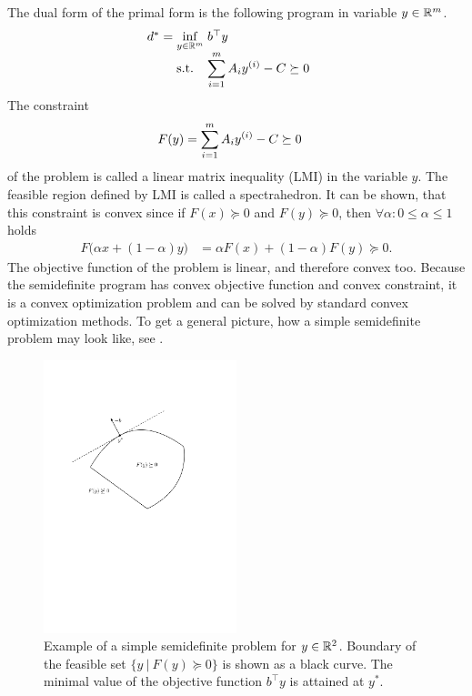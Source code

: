 The dual form of the primal form is the following program in variable $y\in\mathbb{R}^m$.
\begin{align}
  \arraycolsep=1.4pt
  \begin{array}{rclrcl@{\hskip0.5cm}l}
    d^* &=& \displaystyle \inf_{y\in\R^m} & \multicolumn{3}{l}{b^\top y} \\
    && \text{s.t.} & \displaystyle \sum_{i=1}^m A_iy\ind i - C &\succeq& 0
  \end{array}\labeleq{SDP:prelim:dual}
\end{align}
The constraint 
\begin{align}
  F(y) &= \sum_{i=1}^m A_iy^{(i)} - C \succeq 0
\end{align}
of the problem  is called a linear matrix inequality (LMI) in the variable $y$.
The feasible region defined by LMI is called a spectrahedron.
It can be shown, that this constraint is convex since if $F(x) \succeq 0$ and $F(y) \succeq 0$, then $\forall \alpha: 0\leq  \alpha \leq 1$ holds
\begin{align}
  F\big(\alpha x + (1-\alpha)y\big) &= \alpha F(x) + (1-\alpha)F(y) \succeq 0.
\end{align}
The objective function of the problem  is linear, and therefore convex too.
Because the semidefinite program  has convex objective function and convex constraint, it is a convex optimization problem and can be solved by standard convex optimization methods.
To get a general picture, how a simple semidefinite problem may look like, see .

\begin{figure}[ht]
  \centering
  \includegraphics[width=0.5\textwidth]{drawings/SDP_problem.pdf}
  \caption{Example of a simple semidefinite problem for $y\in\mathbb{R}^2$. Boundary of the feasible set $\big\{y\ |\ F(y)\succeq 0\big\}$ is shown as a black curve. The minimal value of the objective function $b^\top y$ is attained at $y^*$.}
\end{figure}

